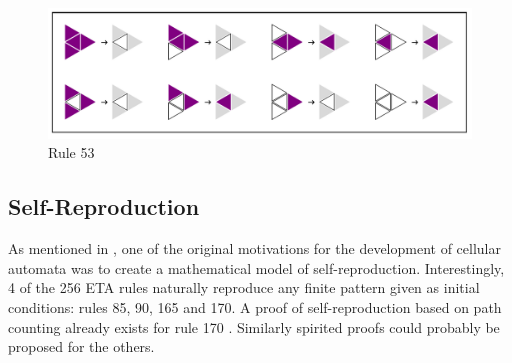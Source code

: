 \documentclass{article}
\begin{document}
\bigskip

\begin{figure}[H]
    \centering
        \includegraphics[width=.7\textwidth]{graphics/behavior/chaos/rule-53.pdf}
    \caption{Rule 53}
    \label{fig:rule-plot-53}
\end{figure}

\pagebreak
\subsection{Self-Reproduction} \label{self-reproduction}

As mentioned in \cite{saadatCopyMachinesSelfreproduction2023}, one of the original motivations for the development of cellular automata was to create a mathematical model of self-reproduction. Interestingly, 4 of the 256 ETA rules naturally reproduce any finite pattern given as initial conditions: rules 85, 90, 165 and 170. A proof of self-reproduction based on path counting already exists for rule 170 \cite{saadatCopyMachinesSelfreproduction2023}. Similarly spirited proofs could probably be proposed for the others.

\vspace{.6cm}
\end{document}
